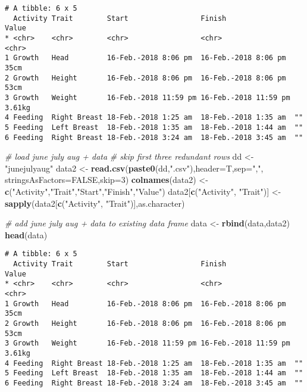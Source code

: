 \documentclass[10,portrait]{article}
\newenvironment{Shaded}{\begin{snugshade}}{\end{snugshade}}
\newcommand{\KeywordTok}[1]{\textcolor[rgb]{0.13,0.29,0.53}{\textbf{#1}}}
\newcommand{\DataTypeTok}[1]{\textcolor[rgb]{0.13,0.29,0.53}{#1}}
\newcommand{\DecValTok}[1]{\textcolor[rgb]{0.00,0.00,0.81}{#1}}
\newcommand{\StringTok}[1]{\textcolor[rgb]{0.31,0.60,0.02}{#1}}
\newcommand{\CommentTok}[1]{\textcolor[rgb]{0.56,0.35,0.01}{\textit{#1}}}
\newcommand{\OtherTok}[1]{\textcolor[rgb]{0.56,0.35,0.01}{#1}}
\newcommand{\NormalTok}[1]{#1}
\begin{document}
\begin{verbatim}
# A tibble: 6 x 5
  Activity Trait        Start                 Finish                Value 
* <chr>    <chr>        <chr>                 <chr>                 <chr> 
1 Growth   Head         16-Feb.-2018 8:06 pm  16-Feb.-2018 8:06 pm  35cm  
2 Growth   Height       16-Feb.-2018 8:06 pm  16-Feb.-2018 8:06 pm  53cm  
3 Growth   Weight       16-Feb.-2018 11:59 pm 16-Feb.-2018 11:59 pm 3.61kg
4 Feeding  Right Breast 18-Feb.-2018 1:25 am  18-Feb.-2018 1:35 am  ""    
5 Feeding  Left Breast  18-Feb.-2018 1:35 am  18-Feb.-2018 1:44 am  ""    
6 Feeding  Right Breast 18-Feb.-2018 3:24 am  18-Feb.-2018 3:45 am  ""    
\end{verbatim}

\begin{Shaded}
\begin{Highlighting}[]
\CommentTok{# load june july aug + data}
\CommentTok{# skip first three redundant rows}
\NormalTok{dd <-}\StringTok{ "junejulyaug"}
\NormalTok{data2 <-}\StringTok{ }\KeywordTok{read.csv}\NormalTok{(}\KeywordTok{paste0}\NormalTok{(dd,}\StringTok{".csv"}\NormalTok{),}\DataTypeTok{header=}\NormalTok{T,}\DataTypeTok{sep=}\StringTok{","}\NormalTok{, }\DataTypeTok{stringsAsFactors=}\OtherTok{FALSE}\NormalTok{,}\DataTypeTok{skip=}\DecValTok{3}\NormalTok{)}
\KeywordTok{colnames}\NormalTok{(data2) <-}\StringTok{ }\KeywordTok{c}\NormalTok{(}\StringTok{"Activity"}\NormalTok{,}\StringTok{"Trait"}\NormalTok{,}\StringTok{"Start"}\NormalTok{,}\StringTok{"Finish"}\NormalTok{,}\StringTok{"Value"}\NormalTok{)}
\NormalTok{data2[}\KeywordTok{c}\NormalTok{(}\StringTok{"Activity"}\NormalTok{, }\StringTok{"Trait"}\NormalTok{)] <-}\StringTok{ }\KeywordTok{sapply}\NormalTok{(data2[}\KeywordTok{c}\NormalTok{(}\StringTok{"Activity"}\NormalTok{, }\StringTok{"Trait"}\NormalTok{)],as.character)}

\CommentTok{# add june july aug + data to existing data frame}
\NormalTok{data <-}\StringTok{ }\KeywordTok{rbind}\NormalTok{(data,data2)}
\KeywordTok{head}\NormalTok{(data)}
\end{Highlighting}
\end{Shaded}

\begin{verbatim}
# A tibble: 6 x 5
  Activity Trait        Start                 Finish                Value 
* <chr>    <chr>        <chr>                 <chr>                 <chr> 
1 Growth   Head         16-Feb.-2018 8:06 pm  16-Feb.-2018 8:06 pm  35cm  
2 Growth   Height       16-Feb.-2018 8:06 pm  16-Feb.-2018 8:06 pm  53cm  
3 Growth   Weight       16-Feb.-2018 11:59 pm 16-Feb.-2018 11:59 pm 3.61kg
4 Feeding  Right Breast 18-Feb.-2018 1:25 am  18-Feb.-2018 1:35 am  ""    
5 Feeding  Left Breast  18-Feb.-2018 1:35 am  18-Feb.-2018 1:44 am  ""    
6 Feeding  Right Breast 18-Feb.-2018 3:24 am  18-Feb.-2018 3:45 am  ""    
\end{verbatim}
\end{document}

